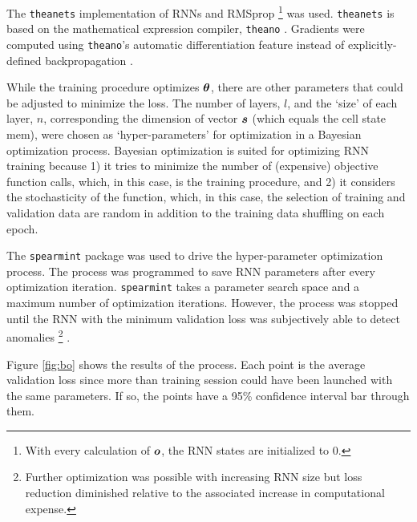 
The \texttt{theanets} \cite{Johnson2015} implementation of RNNs and RMSprop
\footnote{With every calculation of $\boldsymbol{o}$, the RNN states are initialized to 0.}
was used.
%
\texttt{theanets} is based on the mathematical expression compiler, \texttt{theano} \cite{Bergstra2010}.
%
Gradients were computed using \texttt{theano}'s automatic differentiation feature instead of explicitly-defined backpropagation \cite{Rumelhart1986}.


While the training procedure optimizes $\boldsymbol{\theta}$, there are other parameters that could be adjusted to minimize the loss.
%
The number of layers, $l$, and the `size' of each layer, $n$, corresponding the dimension of vector $\boldsymbol{s}$ (which equals the cell state mem), were chosen as `hyper-parameters' for optimization in a Bayesian optimization process.
%
Bayesian optimization is suited for optimizing RNN training because
1) it tries to minimize the number of (expensive) objective function calls, which, in this case, is the training procedure, and
2) it considers the stochasticity of the function, which, in this case, the selection of training and validation data are random in addition to the training data shuffling on each epoch.


The \texttt{spearmint} \cite{snoek2012practical} package was used to drive the hyper-parameter optimization process.
%
The process was programmed to save RNN parameters after every optimization iteration.
%
\texttt{spearmint} takes a parameter search space and a maximum number of optimization iterations.
%
However, the process was stopped until the RNN with the minimum validation loss was subjectively able to detect anomalies
%
\footnote{
Further optimization was possible with increasing RNN size but loss reduction diminished relative to the associated increase in computational expense.
}
.


Figure \ref{fig:bo} shows the results of the process.
%
Each point is the average validation loss since more than training session could have been launched with the same parameters.
%
If so, the points have a 95\% confidence interval bar through them.

